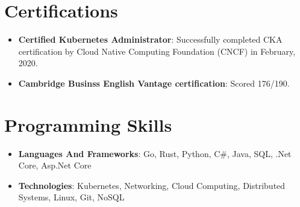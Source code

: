 \documentclass[letterpaper,11pt]{article}
\newcommand{\resumeItem}[2]{
  \item\small{
    \textbf{#1}{: #2 \vspace{-2pt}}
  }
}
\newcommand{\resumeSubItem}[2]{\resumeItem{#1}{#2}\vspace{-4pt}}
\newcommand{\resumeSubHeadingListStart}{\begin{itemize}[leftmargin=*]}
\newcommand{\resumeSubHeadingListEnd}{\end{itemize}}
\begin{document}

\section{Certifications}
\resumeSubHeadingListStart
\resumeSubItem{Certified Kubernetes Administrator}{Successfully completed CKA certification by Cloud Native Computing
  Foundation (CNCF) in February, 2020.}
\resumeSubItem{Cambridge Businss English Vantage certification}
{Scored 176/190.}
\resumeSubHeadingListEnd

\section{Programming Skills}
\resumeSubHeadingListStart
\resumeSubItem{Languages And Frameworks}{Go, Rust, Python, C\#, Java, SQL, .Net Core, Asp.Net Core}
\resumeSubItem{Technologies}{Kubernetes, Networking, Cloud Computing, Distributed Systems, Linux, Git, NoSQL}
\resumeSubHeadingListEnd

\end{document}
